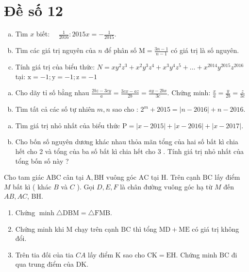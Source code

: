 \onehalfspacing
\section{Đề số 12}
\graphicspath{{./img/}}
\begin{bt} 
    \hfill
	\begin{enumerate}[a.]
		\item Tìm $x$ biết: $\quad \frac{1}{2016}: 2015 x=-\frac{1}{2015}$.
        \item Tìm các giá trị nguyên của $n$ để phân số $\mathrm{M}=\frac{3 n-1}{n-1}$ có giá trị là số nguyên.
        \item Tính giá trị của biểu thức: $N=x y^2 z^3+x^2 y^3 z^4+x^3 y^4 z^5+\ldots+x^{2014} y^{2015} z^{2016}$ tại: $\mathrm{x}=-1 ; \mathrm{y}=-1 ; \mathrm{z}=-1$
	\end{enumerate}
	\loigiai{} 
\end{bt}

\begin{bt}
	\hfill
	\begin{enumerate}[a.]
		\item Cho dãy tỉ số bằng nhau $\frac{2 b z-3 c y}{a}=\frac{3 c x-a z}{2 b}=\frac{a y-2 b x}{3 c}$. Chứng minh: $\frac{x}{a}=\frac{y}{2 b}=\frac{z}{3 c}$
        \item Tìm tất cả các số tự nhiên $m, n$ sao cho : $2^m+2015=|n-2016|+n-2016$.
	\end{enumerate}
	\loigiai{} 
\end{bt}

\begin{bt}
	\hfill
	\begin{enumerate}[a.]
		\item Tìm giá trị nhỏ nhất của biểu thức $\mathrm{P}=|x-2015|+|x-2016|+|x-2017|$.
        \item Cho bốn số nguyên dương khác nhau thỏa mãn tổng của hai số bất kì chia hết cho 2 và tổng của ba số bất kì chia hết cho 3 . Tính giá trị nhỏ nhất của tổng bốn số này ?
	\end{enumerate}
	\loigiai{}
\end{bt}

\begin{bt}
    Cho tam giác $\mathrm{ABC}$ cân tại $\mathrm{A}, \mathrm{BH}$ vuông góc $\mathrm{AC}$ tại $\mathrm{H}$. Trên cạnh $\mathrm{BC}$ lấy điểm $M$ bất kì ( khác $B$ và $C$ ). Gọi $D, E, F$ là chân đường vuông góc hạ từ $M$ đến $A B, A C$, $\mathrm{BH}$.
    \begin{enumerate}
        \item Chứng $\operatorname{minh} \triangle \mathrm{DBM}=\triangle \mathrm{FMB}$.
        \item Chứng minh khi $\mathrm{M}$ chạy trên cạnh $\mathrm{BC}$ thì tổng $\mathrm{MD}+\mathrm{ME}$ có giá trị không đổi.
        \item Trên tia đối của tia $C A$ lấy điểm $\mathrm{K}$ sao cho $\mathrm{CK}=\mathrm{EH}$. Chứng minh $\mathrm{BC}$ đi qua trung điểm của DK.
    \end{enumerate}
\loigiai{}
\end{bt}

